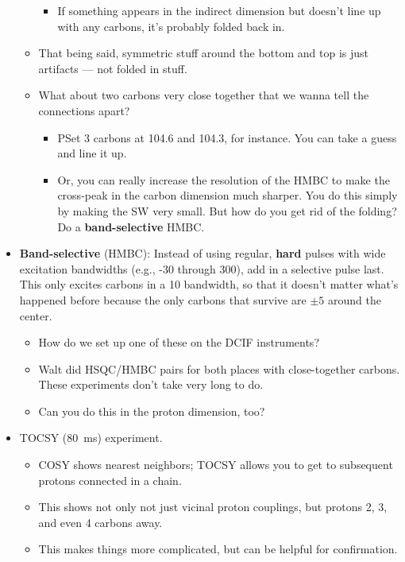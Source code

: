 \documentclass[../notes.tex]{subfiles}
\begin{document}
\begin{itemize}
\begin{itemize}
\begin{itemize}
            \item If something appears in the indirect dimension but doesn't line up with any carbons, it's probably folded back in.
        \end{itemize}
        \item That being said, symmetric stuff around the bottom and top is just artifacts --- not folded in stuff.
        \item What about two carbons very close together that we wanna tell the connections apart?
        \begin{itemize}
            \item PSet 3 carbons at 104.6 and 104.3, for instance. You can take a guess and line it up.
            \item Or, you can really increase the resolution of the HMBC to make the cross-peak in the carbon dimension much sharper. You do this simply by making the SW very small. But how do you get rid of the folding? Do a \textbf{band-selective} HMBC.
        \end{itemize}
    \end{itemize}
    \item \textbf{Band-selective} (HMBC): Instead of using regular, \textbf{hard} pulses with wide excitation bandwidths (e.g., -30 through 300), add in a selective pulse last. This only excites carbons in a \SI{10}{\partspermillion} bandwidth, so that it doesn't matter what's happened before because the only carbons that survive are $\pm 5$ around the center.
    \begin{itemize}
        \item How do we set up one of these on the DCIF instruments?
        \item Walt did HSQC/HMBC pairs for both places with close-together carbons. These experiments don't take very long to do.
        \item Can you do this in the proton dimension, too?
    \end{itemize}
    \item TOCSY (\SI{80}{\milli\second}) experiment.
    \begin{itemize}
        \item COSY shows nearest neighbors; TOCSY allows you to get to subsequent protons connected in a chain.
        \item This shows not only not just vicinal proton couplings, but protons 2, 3, and even 4 carbons away.
        \item This makes things more complicated, but can be helpful for confirmation.

\end{itemize}
\end{itemize}
\end{document}
